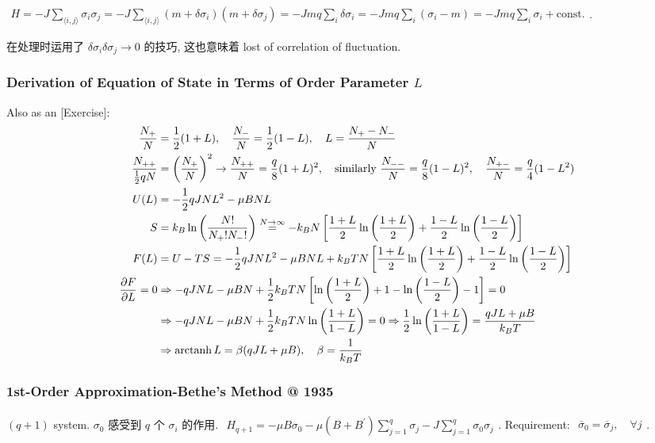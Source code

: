 \documentclass[../../main.tex]{subfiles}
\begin{document}
$\begin{aligned}
    H = -J\sum_{\langle i,j\rangle}\sigma_{i}\sigma_{j} = -J\sum_{\langle i,j\rangle}(m+\delta\sigma_{i})(m+\delta\sigma_{j}) = -Jmq\sum_{i}\delta\sigma_{i} = -Jmq\sum_{i}(\sigma_{i}-m) = -Jmq\sum_{i}\sigma_{i} + \text{const.}
\end{aligned}$. 

在处理时运用了 $\delta\sigma_{i}\delta\sigma_{j}\rightarrow 0$ 的技巧, 这也意味着 lost of correlation of fluctuation. 

\subsubsection{Derivation of Equation of State in Terms of Order Parameter $L$}
Also as an [Exercise]: 
\begin{align*}
    \frac{N_{+}}{N} &= \frac{1}{2}(1+L),\quad \frac{N_{-}}{N} = \frac{1}{2}(1-L), \quad L = \frac{N_{+}-N_{-}}{N}\\
    \frac{N_{++}}{\frac{1}{2}qN} &= \left(\frac{N_{+}}{N}\right)^{2}\rightarrow \frac{N_{++}}{N} = \frac{q}{8}(1+L)^{2},\quad\text{similarly }\frac{N_{--}}{N} = \frac{q}{8}(1-L)^{2},\quad \frac{N_{+-}}{N} = \frac{q}{4}(1-L^{2})\\
    U(L) &= -\frac{1}{2}qJNL^{2} - \mu BNL\\
    S &= k_{B}\ln{\left(\frac{N!}{N_{+}!N_{-}!}\right)} \stackrel{N\rightarrow\infty}{=} -k_{B}N\left[\frac{1+L}{2}\ln{\left(\frac{1+L}{2}\right)} + \frac{1-L}{2}\ln{\left(\frac{1-L}{2}\right)}\right]\\
    F(L) &= U-TS = -\frac{1}{2}qJNL^{2} - \mu BNL + k_{B}TN\left[\frac{1+L}{2}\ln{\left(\frac{1+L}{2}\right)} + \frac{1-L}{2}\ln{\left(\frac{1-L}{2}\right)}\right]\\ 
    \frac{\partial F}{\partial L} = 0 &\Rightarrow -qJNL - \mu BN + \frac{1}{2}k_{B}TN\left[\ln{\left(\frac{1+L}{2}\right)} + 1 - \ln{\left(\frac{1-L}{2}\right)} - 1\right] = 0\\
    & \Rightarrow -qJNL - \mu BN + \frac{1}{2}k_{B}TN\ln{\left(\frac{1+L}{1-L}\right)} = 0\Rightarrow \frac{1}{2}\ln{\left(\frac{1+L}{1-L}\right)} = \frac{qJL + \mu B}{k_{B}T}\\
    & \Rightarrow \operatorname{arctanh}{L} = \beta(qJL+\mu B),\quad \beta = \frac{1}{k_{B}T}
\end{align*}
\subsubsection{1st-Order Approximation-Bethe's Method @ 1935}
$(q+1)$ system. $\sigma_{0}$ 感受到 $q$ 个 $\sigma_{i}$ 的作用. $\begin{aligned}
    H_{q+1} = -\mu B\sigma_{0} - \mu\left(B+B^{\prime}\right)\sum_{j=1}^{q}\sigma_{j} - J\sum_{j=1}^{q}\sigma_{0}\sigma_{j}
\end{aligned}$. Requirement: $\begin{aligned}
    \overline{\sigma}_{0} = \overline{\sigma}_{j},\quad\forall j
\end{aligned}$. 
\end{document}
